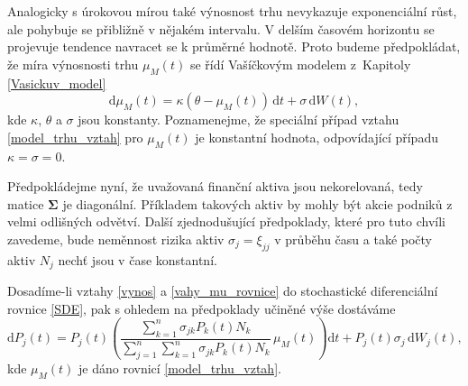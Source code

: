 \documentclass[a4paper,12pt]{report}
\theoremstyle{definition} \newtheorem{definice}[veta]{Definice}
\theoremstyle{remark}
\begin{document}
Analogicky s úrokovou mírou také výnosnost trhu nevykazuje exponenciální růst, ale pohybuje se přibližně v nějakém intervalu. 
V delším časovém horizontu se projevuje tendence navracet se k průměrné hodnotě.
Proto budeme předpokládat, že míra výnosnosti trhu $\mu_M(t)$ se řídí Vašíčkovým modelem z~Kapitoly \ref{Vasickuv_model}
\begin{equation} \label{model_trhu_vztah}
\mathrm{d}\mu_M(t)=\kappa(\theta-\mu_M(t))\,\mathrm{d}t+\sigma\,\mathrm{d}W(t),
\end{equation}
kde $\kappa$, $\theta$ a $\sigma$ jsou konstanty.
Poznamenejme, že speciální případ vztahu \eqref{model_trhu_vztah} pro $\mu_M(t)$ je konstantní hodnota, odpovídající případu $\kappa=\sigma=0$.

Předpokládejme nyní, že uvažovaná finanční aktiva jsou nekorelovaná, tedy matice $\boldsymbol{\Sigma}$ je diagonální.
Příkladem takových aktiv by mohly být akcie podniků z velmi odlišných odvětví.
Další zjednodušující předpoklady, které pro tuto chvíli zavedeme, bude neměnnost rizika aktiv $\sigma_j=\xi_{jj}$ v průběhu času a také počty aktiv $N_j$ nechť jsou v čase konstantní.

Dosadíme-li vztahy \eqref{vynos} a \eqref{vahy_mu_rovnice} do stochastické diferenciální rovnice \eqref{SDE}, pak s ohledem na předpoklady učiněné výše dostáváme
\begin{equation}  \label{SDE_cen_diag}
\mathrm{d}P_j(t)=P_j(t)\left(\frac{\sum\limits_{k=1}^n\sigma_{jk}P_k(t)N_k}{\sum\limits_{j=1}^n\sum\limits_{k=1}^n\sigma_{jk}P_k(t)N_k}\, \mu_M(t)\right)\mathrm{d}t+P_j(t)\sigma_{j}\,\mathrm{d}W_j(t),
\end{equation}
kde $\mu_M(t)$ je dáno rovnicí \eqref{model_trhu_vztah}.
\end{document}
